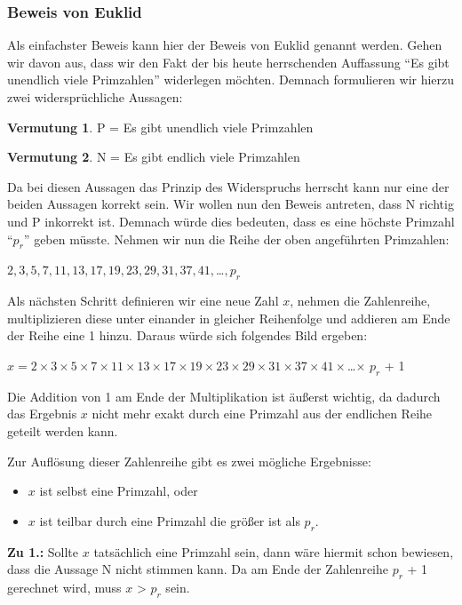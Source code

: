 \documentclass[12pt,a4paper]{article}
\theoremstyle{definition}
\newtheorem{vermutung}{Vermutung}[subsection]
\begin{document}
\subsubsection{Beweis von Euklid}\label{Beweis von Euklid}
Als einfachster Beweis kann hier der Beweis von Euklid genannt werden.
Gehen wir davon aus, dass wir den Fakt der bis heute herrschenden Auffassung “Es gibt unendlich viele Primzahlen” widerlegen möchten.
Demnach formulieren wir hierzu zwei widersprüchliche Aussagen:
\begin{center}
\begin{vermutung} P = Es gibt unendlich viele Primzahlen\end{vermutung}
\begin{vermutung} N = Es gibt endlich viele Primzahlen\end{vermutung}
\end{center}
Da bei diesen Aussagen das Prinzip des Widerspruchs herrscht kann nur eine der beiden Aussagen korrekt sein.
Wir wollen nun den Beweis antreten, dass N richtig und P inkorrekt ist.
Demnach würde dies bedeuten, dass es eine höchste Primzahl “$p_r$” geben müsste.
Nehmen wir nun die Reihe der oben angeführten Primzahlen:
\begin{center}
$2, 3, 5, 7, 11, 13, 17, 19, 23, 29, 31, 37, 41, $…$, p_r$
\end{center}

Als nächsten Schritt definieren wir eine neue Zahl $x$, nehmen die Zahlenreihe, multiplizieren diese unter einander in gleicher Reihenfolge und addieren am Ende der Reihe eine 1 hinzu.
Daraus würde sich folgendes Bild ergeben:

\begin{center}
$x = 2\times3\times5\times7\times11\times13\times17\times19\times23\times29\times31\times37\times41\times$…$\times$ $p_r$ + 1
\end{center}

Die Addition von 1 am Ende der Multiplikation ist äußerst wichtig, da dadurch das Ergebnis $x$ nicht mehr exakt durch eine Primzahl aus der endlichen Reihe geteilt werden kann.

Zur Auflösung dieser Zahlenreihe gibt es zwei mögliche Ergebnisse:
\begin{itemize}
\item[1.] $x$ ist selbst eine Primzahl, oder
\item[2.] $x$ ist teilbar durch eine Primzahl die größer ist als $p_r$.
\end{itemize}
\textbf{Zu 1.:} Sollte $x$ tatsächlich eine Primzahl sein, dann wäre hiermit schon bewiesen, dass die Aussage N nicht stimmen kann.
Da am Ende der Zahlenreihe $p_r$ + 1 gerechnet wird, muss $x$ > $p_r$ sein.
\end{document}
